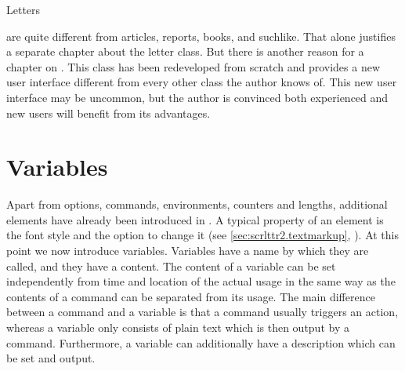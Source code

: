 %
\iffalse
  Since the June 2002 release {\KOMAScript} provides a completely
  rewritten letter class\ChangedAt{v2.8q}{\Class{scrlttr2}}. Although
  part of the code is identical to that of the main classes described
  in \autoref{cha:maincls}, letters
\else
  Letters
\fi
are quite different from articles,
reports, books, and suchlike.  That alone justifies a separate
chapter about the letter class. But there is another reason for a
chapter on . This class has been redeveloped from
scratch and provides a new user interface different from every other
class the author knows of. This new user interface may be uncommon,
but the author is convinced both experienced and new {\KOMAScript}
users will benefit from its advantages.


\section{Variables}
\label{sec:scrlttr2.variables}%

Apart from options, commands, environments, counters and lengths,
additional elements have already been introduced in \KOMAScript.  A
typical property of an element is the font style and the option to
change it (see \autoref{sec:scrlttr2.textmarkup},
). At this point we now
introduce variables. Variables have a name by which they are called,
and they have a content. The content of a variable can be set
independently from time and location of the actual usage in the same
way as the contents of a command can be separated from its usage. The
main difference between a command and a variable is that a command
usually triggers an action, whereas a variable only consists of plain
text which is then output by a command. Furthermore, a variable can
additionally have a description which can be set and output.

